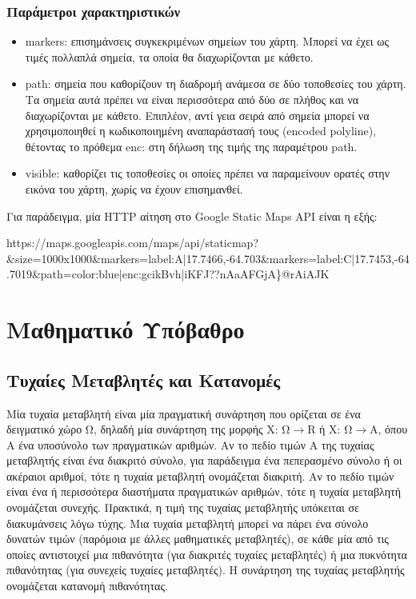 \subsubsection{Παράμετροι χαρακτηριστικών}

\begin{itemize}
 \item markers: επισημάνσεις συγκεκριμένων σημείων του χάρτη. Μπορεί να έχει ως τιμές πολλαπλά σημεία, τα οποία θα διαχωρίζονται με κάθετο.
 \item path: σημεία που καθορίζουν τη διαδρομή ανάμεσα σε δύο τοποθεσίες του χάρτη. Τα σημεία αυτά πρέπει να είναι περισσότερα από δύο σε πλήθος και να διαχωρίζονται 
 με κάθετο. Επιπλέον, αντί γεια σειρά από σημεία μπορεί να χρησιμοποιηθεί η κωδικοποιημένη αναπαράστασή τους (encoded polyline), θέτοντας το πρόθεμα enc: στη δήλωση της τιμής 
 της παραμέτρου path.
 \item visible: καθορίζει τις τοποθεσίες οι οποίες πρέπει να παραμείνουν ορατές στην εικόνα του χάρτη, χωρίς να έχουν επισημανθεί.
\end{itemize}

Για παράδειγμα, μία HTTP αίτηση στο Google Static Maps API είναι η εξής:

\begin{center}
 https://maps.googleapis.com/maps/api/staticmap?\&size=1000x1000\&markers=label:A|17.7466,-64.703\&markers=label:C|17.7453,-64.7019\&path=color:blue|enc:gcikBvh|iKFJ??nAaAFGjA\}@rAiAJK
\end{center}

\section{Μαθηματικό Υπόβαθρο}

\subsection{Τυχαίες Μεταβλητές και Κατανομές}

Μία τυχαία μεταβλητή είναι μία πραγματική συνάρτηση που ορίζεται σε ένα δειγματικό χώρο Ω, δηλαδή μία συνάρτηση της μορφής Χ: Ω\(\rightarrow\)R ή Χ: Ω\(\rightarrow\)Α, 
όπου Α ένα υποσύνολο των πραγματικών αριθμών. Αν το πεδίο τιμών Α της τυχαίας μεταβλητής είναι ένα διακριτό σύνολο, για παράδειγμα ένα πεπερασμένο σύνολο ή οι ακέραιοι 
αριθμοί, τότε η τυχαία μεταβλητή ονομάζεται διακριτή. Αν το πεδίο τιμών είναι ένα ή περισσότερα διαστήματα πραγματικών αριθμών, τότε η τυχαία μεταβλητή ονομάζεται συνεχής. 
Πρακτικά, η τιμή της τυχαίας μεταβλητής υπόκειται σε διακυμάνσεις λόγω τύχης. Μια τυχαία μεταβλητή μπορεί να πάρει 
ένα σύνολο δυνατών τιμών (παρόμοια με άλλες μαθηματικές μεταβλητές), σε κάθε μία από τις οποίες αντιστοιχεί μια πιθανότητα (για διακριτές τυχαίες μεταβλητές) ή μια 
πυκνότητα πιθανότητας (για συνεχείς τυχαίες μεταβλητές). Η συνάρτηση της τυχαίας μεταβλητής ονομάζεται κατανομή πιθανότητας.

